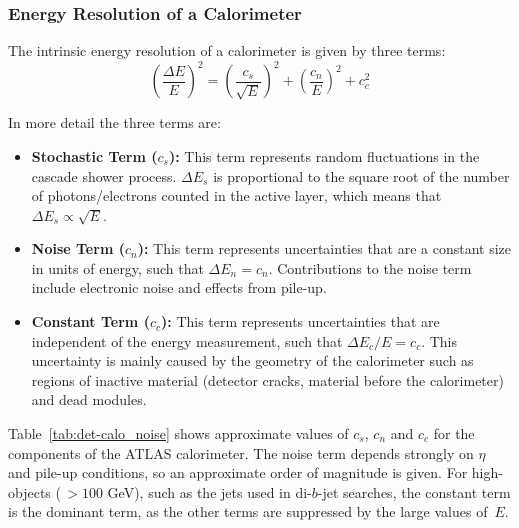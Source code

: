 \subsubsection{Energy Resolution of a Calorimeter}
\label{sec:det-calo_noise}

The intrinsic energy resolution of a calorimeter is given by three terms:
\begin{equation}
  \left(\frac{\Delta E}{E}\right)^2 = \left(\frac{c_s}{\sqrt{E}}\right)^2 + \left(\frac{c_n}{E}\right)^2 + c_c^2
\end{equation}

\noindent
In more detail the three terms are:
\begin{itemize}[leftmargin=*]
\item\textbf{Stochastic Term ($c_s$):}
  This term represents random fluctuations in the cascade shower process.
  $\Delta E_s$ is proportional to the square root of the number of photons/electrons counted in the active layer,
  which means that $\Delta E_s \propto \sqrt{E}$. \vspace{1em}
\item\textbf{Noise Term ($c_n$):}
  This term represents uncertainties that are a constant size in units of energy, such that $\Delta E_n = c_n$.
  Contributions to the noise term include electronic noise and effects from pile-up. \vspace{1em} %
\item\textbf{Constant Term ($c_c$):}
  This term represents uncertainties that are independent of the energy measurement, such that $\Delta E_c/E = c_c$.
  This uncertainty is mainly caused by the geometry of the calorimeter such as regions of inactive material (detector cracks, material before the calorimeter) and dead modules.
\end{itemize}

Table~\ref{tab:det-calo_noise} shows approximate values of $c_s$, $c_n$  and $c_c$ for the components of the ATLAS calorimeter.
The noise term depends strongly on $\eta$ and pile-up conditions, so an approximate order of magnitude is given.
For high-\pT{} objects ($\,> 100$ GeV), such as the jets used in di-$b$-jet searches, the constant term is the dominant term,
as the other terms are suppressed by the large values of~$E$.

